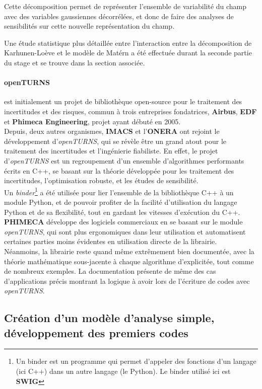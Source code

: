\documentclass[a4paper,10pt]{article}
\begin{document}
Cette décomposition permet de représenter l'ensemble de variabilité du champ avec des variables gaussiennes décorrélées, et donc de faire des analyses de sensibilités sur cette nouvelle représentation du champ. \smallskip

Une étude statistique plus détaillée entre l'interaction entre la décomposition de Karhunen-Loève  et le modèle de Matérn a été effectuée durant la seconde partie du stage et se trouve dans la section associée. \smallskip

\paragraph{\textbf{openTURNS}}
est initialement un projet de bibliothèque open-source pour le traitement des incertitudes et des risques, commun à trois entreprises fondatrices, \textbf{Airbus}, \textbf{EDF} et \textbf{Phimeca Engineering}, projet ayant débuté en 2005. \\
Depuis, deux autres organismes, \textbf{IMACS} et l'\textbf{ONERA} ont rejoint le développement d'\emph{openTURNS}, qui se révèle être un grand atout pour le traitement des incertitudes et l’ingénierie fiabiliste.
En effet, le projet d'\emph{openTURNS} est un regroupement d'un ensemble d'algorithmes performants écrits en C++, se basant sur la théorie développée pour les traitement des incertitudes, l'optimisation robuste, et les études de sensibilité.\\ 
Un \textit{binder}\footnote{Un binder est un programme qui permet d'appeler des fonctions d'un langage (ici C++) dans un autre langage (le Python). Le binder utilisé ici est \textbf{SWIG}} a été utilisée pour lier l'ensemble de la bibliothèque C++ à un module Python, et de pouvoir profiter de la facilité d'utilisation du langage Python et de sa flexibilité, tout en gardant les vitesses d’exécution du C++.\\
\textbf{PHIMECA} développe des logiciels commerciaux en se basant sur le module \emph{openTURNS}, qui sont plus ergonomiques dans leur utilisation et automatisent certaines parties moins évidentes en utilisation directe de la librairie. \\
Néanmoins, la librairie reste quand même extrêmement bien documentée, avec la théorie mathématique sous-jacente à chaque algorithme d'explicitée, tout comme de nombreux exemples. La documentation présente de même des cas d'applications précis montrant la logique à avoir lors de l'écriture de codes avec \emph{openTURNS}.


\subsection{Création d'un modèle d'analyse simple, développement des premiers codes}
\end{document}
